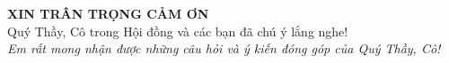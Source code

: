 \documentclass[fleqn]{beamer}
\begin{document}
\begin{frame}
  \centering
  \vspace{1cm}
  {\LARGE\bfseries XIN TRÂN TRỌNG CẢM ƠN}\\[0.5cm]
  {\large Quý Thầy, Cô trong Hội đồng và các bạn đã chú ý lắng nghe!}\\[1.5cm]
  {\large\textit{Em rất mong nhận được những câu hỏi và ý kiến đóng góp của Quý Thầy, Cô!}}
\end{frame}
\end{document}
